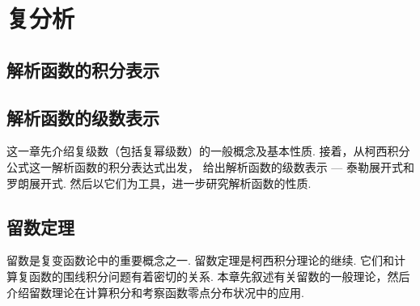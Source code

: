 \part{复分析}




\chapter{解析函数的积分表示}





\chapter{解析函数的级数表示}
这一章先介绍复级数（包括复幂级数）的一般概念及基本性质.
接着，从柯西积分公式这一解析函数的积分表达式出发，
给出解析函数的级数表示 --- 泰勒展开式和罗朗展开式.
然后以它们为工具，进一步研究解析函数的性质.








\chapter{留数定理}
留数是复变函数论中的重要概念之一.
留数定理是柯西积分理论的继续.
它们和计算复函数的围线积分问题有着密切的关系.
本章先叙述有关留数的一般理论，然后介绍留数理论在计算积分和考察函数零点分布状况中的应用.




